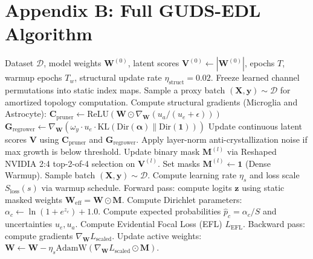 \documentclass[letterpaper]{article} %
\newcommand{\Dir}{\text{Dir}}
\newcommand{\KL}{\text{KL}}
\begin{document}
\section{Appendix B: Full GUDS-EDL Algorithm}
\begin{algorithm}[t]
\caption{Universal GUDS-EDL Training and Optimization Loop}
\label{alg:guds_edl}
\begin{algorithmic}[1]
\REQUIRE Dataset $\mathcal{D}$, model weights $\bm{W}^{(0)}$, latent scores $\bm{V}^{(0)} \leftarrow |\bm{W}^{(0)}|$, epochs $T$, warmup epochs $T_w$, structural update rate $\eta_{\text{struct}} = 0.02$.
        \STATE Freeze learned channel permutations into static index maps.
    \ENDIF
        \STATE Sample a proxy batch $(\bm{X}, \bm{y}) \sim \mathcal{D}$ for amortized topology computation.
        \STATE Compute structural gradients (Microglia and Astrocyte):
        \STATE \quad $\bm{C}_{\text{pruner}} \leftarrow \text{ReLU}\left( \bm{W} \odot \nabla_{\bm{W}} (u_a / (u_e + \epsilon)) \right)$
        \STATE \quad $\bm{G}_{\text{regrower}} \leftarrow \nabla_{\bm{W}} \left( \omega_y \cdot u_e \cdot \KL(\Dir(\bm{\alpha}) \parallel \Dir(\mathbf{1})) \right)$
        \STATE Update continuous latent scores $\bm{V}$ using $\bm{C}_{\text{pruner}}$ and $\bm{G}_{\text{regrower}}$.
        \STATE Apply layer-norm anti-crystallization noise if max growth is below threshold.
        \STATE Update binary mask $\bm{M}^{(l)}$ via Reshaped NVIDIA 2:4 top-2-of-4 selection on $\bm{V}^{(l)}$.
    \ELSE
        \STATE Set masks $\bm{M}^{(l)} \leftarrow \mathbf{1}$ (Dense Warmup).
    \ENDIF
        \STATE Sample batch $(\bm{X}, \bm{y}) \sim \mathcal{D}$.
        \STATE Compute learning rate $\eta_s$ and loss scale $S_{\text{loss}}(s)$ via warmup schedule.
        \STATE Forward pass: compute logits $\bm{z}$ using static masked weights $\bm{W}_{\text{eff}} = \bm{W} \odot \bm{M}$.
        \STATE Compute Dirichlet parameters: $\alpha_c \leftarrow \ln(1 + e^{z_c}) + 1.0$.
        \STATE Compute expected probabilities $\hat{p}_c = \alpha_c/S$ and uncertainties $u_e, u_a$.
        \STATE Compute Evidential Focal Loss (EFL) $L_{\text{EFL}}$.
        \STATE Backward pass: compute gradients $\nabla_{\bm{W}} L_{\text{scaled}}$.
        \STATE Update active weights: $\bm{W} \leftarrow \bm{W} - \eta_s \text{AdamW}(\nabla_{\bm{W}} L_{\text{scaled}} \odot \bm{M})$.
    \ENDFOR
\ENDFOR
\end{algorithmic}
\end{algorithm}
\end{document}
